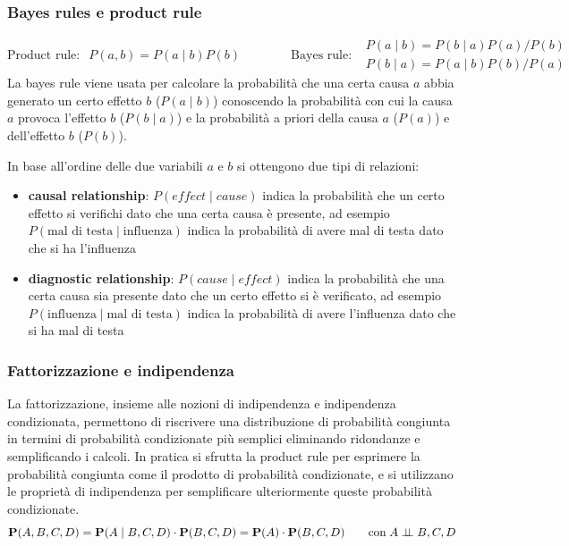 \subsubsection*{Bayes rules e product rule}
\[\text{Product rule}: \;\; P(a, b) = P(a \mid b)P(b) \qquad\qquad \text{Bayes rule}: \;\; \begin{array}{l}
	P(a \mid b) = P(b \mid a)P(a) / P(b) \\[5pt]
	P(b \mid a) = P(a \mid b)P(b) / P(a)
\end{array}\]
La bayes rule viene usata per calcolare la probabilità che una certa causa \(a\) abbia generato un certo effetto \(b\)
(\(P(a \mid b)\)) conoscendo la probabilità con cui la causa \(a\) provoca l'effetto \(b\) (\(P(b \mid a)\)) e la probabilità
a priori della causa \(a\) (\(P(a)\)) e dell'effetto \(b\) (\(P(b)\)).

In base all'ordine delle due variabili \(a\) e \(b\) si ottengono due tipi di relazioni:
\begin{itemize}
	\item \textbf{causal relationship}: \(P(\textit{effect} \mid \textit{cause})\) indica la probabilità che un certo effetto
	si verifichi dato che una certa causa è presente, ad esempio \(P(\text{mal di testa} \mid \text{influenza})\) indica la
	probabilità di avere mal di testa dato che si ha l'influenza
	\item \textbf{diagnostic relationship}: \(P(\textit{cause} \mid \textit{effect})\) indica la probabilità che una certa
	causa sia presente dato che un certo effetto si è verificato, ad esempio \(P(\text{influenza} \mid \text{mal di testa})\)
	indica la probabilità di avere l'influenza dato che si ha mal di testa
\end{itemize}

\subsubsection*{Fattorizzazione e indipendenza}
La fattorizzazione, insieme alle nozioni di indipendenza e indipendenza condizionata, permettono di riscrivere una distribuzione
di probabilità congiunta in termini di probabilità condizionate più semplici eliminando ridondanze e semplificando i calcoli.
In pratica si sfrutta la product rule per esprimere la probabilità congiunta come il prodotto di probabilità condizionate, e
si utilizzano le proprietà di indipendenza per semplificare ulteriormente queste probabilità condizionate.
\[\textbf{P}(A, B, C, D) = \textbf{P}(A \mid B, C, D) \cdot \textbf{P}(B, C, D) = \textbf{P}(A) \cdot \textbf{P}(B, C, D) \qquad \text{con} \; A \perp \!\!\! \perp B, C, D \]

